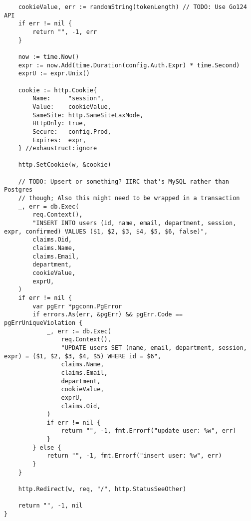 \begin{verbatim}
	cookieValue, err := randomString(tokenLength) // TODO: Use Go124 API
	if err != nil {
		return "", -1, err
	}

	now := time.Now()
	expr := now.Add(time.Duration(config.Auth.Expr) * time.Second)
	exprU := expr.Unix()

	cookie := http.Cookie{
		Name:     "session",
		Value:    cookieValue,
		SameSite: http.SameSiteLaxMode,
		HttpOnly: true,
		Secure:   config.Prod,
		Expires:  expr,
	} //exhaustruct:ignore

	http.SetCookie(w, &cookie)

	// TODO: Upsert or something? IIRC that's MySQL rather than Postgres
	// though; Also this might need to be wrapped in a transaction
	_, err = db.Exec(
		req.Context(),
		"INSERT INTO users (id, name, email, department, session, expr, confirmed) VALUES ($1, $2, $3, $4, $5, $6, false)",
		claims.Oid,
		claims.Name,
		claims.Email,
		department,
		cookieValue,
		exprU,
	)
	if err != nil {
		var pgErr *pgconn.PgError
		if errors.As(err, &pgErr) && pgErr.Code == pgErrUniqueViolation {
			_, err := db.Exec(
				req.Context(),
				"UPDATE users SET (name, email, department, session, expr) = ($1, $2, $3, $4, $5) WHERE id = $6",
				claims.Name,
				claims.Email,
				department,
				cookieValue,
				exprU,
				claims.Oid,
			)
			if err != nil {
				return "", -1, fmt.Errorf("update user: %w", err)
			}
		} else {
			return "", -1, fmt.Errorf("insert user: %w", err)
		}
	}

	http.Redirect(w, req, "/", http.StatusSeeOther)

	return "", -1, nil
}
\end{verbatim}

\printbibliography


